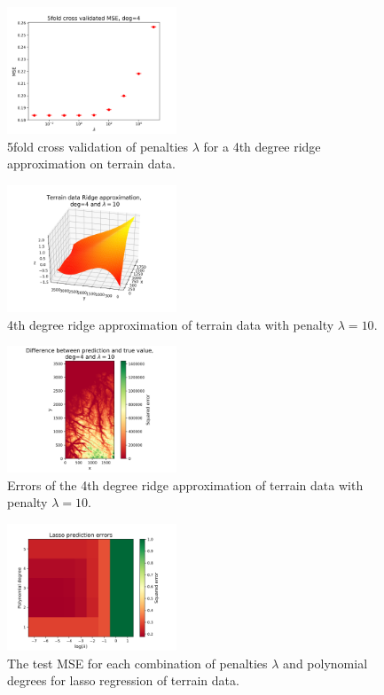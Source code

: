 \documentclass[notitlepage, reprint, nofootinbib]{revtex4-1}
\begin{document}
\begin{figure}
	\centering
	\includegraphics[width=0.45\textwidth]{../Figures/kfold_mse_terrain_ridge_deg4.png}
	\caption{5fold cross validation of penalties $\lambda$ for a 4th degree ridge approximation on terrain data.}
	\label{fig20}
\end{figure}

\begin{figure}
	\centering
	\includegraphics[width=0.45\textwidth]{../Figures/terrain_ridge_deg4_adjusted.png}
	\caption{4th degree ridge approximation of terrain data with penalty $\lambda=10$.}
	\label{fig21}
\end{figure}

\begin{figure}
	\centering
	\includegraphics[width=0.45\textwidth]{../Figures/terrain_ridge_error_deg4.png}
	\caption{Errors of the 4th degree ridge approximation of terrain data with penalty $\lambda=10$.}
	\label{fig22}
\end{figure}


\begin{figure}
	\centering
	\includegraphics[width=0.45\textwidth]{../Figures/lasso_grid_search.png}
	\caption{The test MSE for each combination of penalties $\lambda$ and polynomial degrees for lasso regression of terrain data.}
	\label{fig23}
\end{figure}
\end{document}
